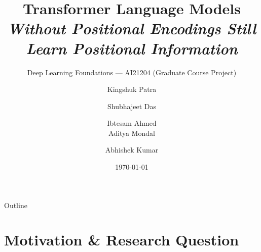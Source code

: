 \documentclass[aspectratio=169, 10pt]{beamer}
\title[No-Pos Transformer]{%
  \textbf{Transformer Language Models}\\
  \textit{Without Positional Encodings Still Learn Positional Information}%
}
\subtitle{Deep Learning Foundations --- AI21204 (Graduate Course Project)}
\author[Patra et al.]{%
  Kingshuk Patra \and Shubhajeet Das \and Ibtesam Ahmed \\
  Aditya Mondal \and Abhishek Kumar%
}
\date{\today}
\institute[AI21204]{Graduate Course Project}
\begin{document}
\begin{frame}[plain]
  \titlepage
\end{frame}

\begin{frame}{Outline}
  \tableofcontents[hideallsubsections]
\end{frame}

\section{Motivation \& Research Question}
\end{document}
